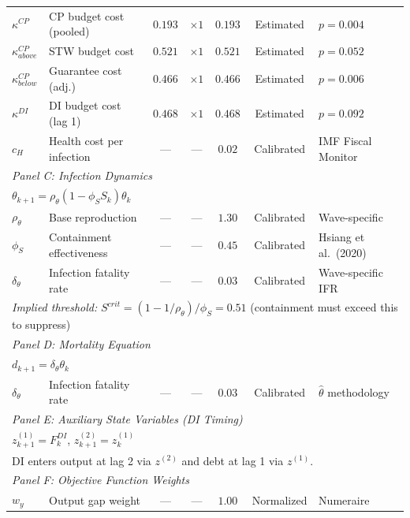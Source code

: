 \begin{table}[htbp]
\begin{tabular}{llccccl}
$\kappa^{CP}$    & CP budget cost (pooled)   & $0.193$   & $\times 1$   & $0.193$  & Estimated & $p = 0.004$ \\
$\kappa^{CP}_{above}$ & STW budget cost      & $0.521$   & $\times 1$   & $0.521$  & Estimated & $p = 0.052$ \\
$\kappa^{CP}_{below}$ & Guarantee cost (adj.)& $0.466$   & $\times 1$   & $0.466$  & Estimated & $p = 0.006$ \\
$\kappa^{DI}$    & DI budget cost (lag 1)    & $0.468$   & $\times 1$   & $0.468$  & Estimated & $p = 0.092$ \\
$c_H$            & Health cost per infection  & ---       & ---          & $0.02$   & Calibrated & IMF Fiscal Monitor \\[6pt]
\midrule
\multicolumn{7}{l}{\textit{Panel C: Infection Dynamics}} \\
\multicolumn{7}{l}{$\theta_{k+1} = \rho_\theta (1 - \phi_S S_k) \theta_k$} \\[6pt]
$\rho_\theta$    & Base reproduction         & ---       & ---          & $1.30$   & Calibrated & Wave-specific \\
$\phi_S$         & Containment effectiveness & ---       & ---          & $0.45$   & Calibrated & Hsiang et al.\ (2020) \\
$\delta_\theta$  & Infection fatality rate    & ---       & ---          & $0.03$   & Calibrated & Wave-specific IFR \\[6pt]
\multicolumn{7}{l}{\textit{Implied threshold:} $S^{crit} = (1-1/\rho_\theta)/\phi_S = 0.51$ (containment must exceed this to suppress)} \\[6pt]
\midrule
\multicolumn{7}{l}{\textit{Panel D: Mortality Equation}} \\
\multicolumn{7}{l}{$d_{k+1} = \delta_\theta \theta_k$} \\[6pt]
$\delta_\theta$  & Infection fatality rate    & ---       & ---          & $0.03$   & Calibrated & $\hat{\theta}$ methodology \\[6pt]
\midrule
\multicolumn{7}{l}{\textit{Panel E: Auxiliary State Variables (DI Timing)}} \\
\multicolumn{7}{l}{$z_{k+1}^{(1)} = F_k^{DI}$, \quad $z_{k+1}^{(2)} = z_k^{(1)}$} \\[6pt]
\multicolumn{7}{l}{DI enters output at lag 2 via $z^{(2)}$ and debt at lag 1 via $z^{(1)}$.} \\[6pt]
\midrule
\multicolumn{7}{l}{\textit{Panel F: Objective Function Weights}} \\[6pt]
$w_y$            & Output gap weight         & ---       & ---          & $1.00$   & Normalized & Numeraire \\

\end{tabular}
\end{table}
